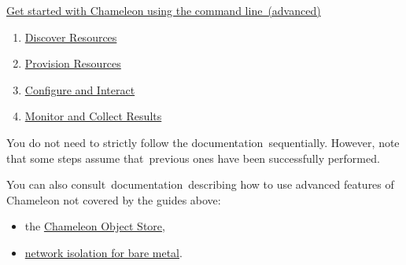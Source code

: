 \href{https://www.chameleoncloud.org/discover-resources-command-lines}{Get
started with Chameleon using the command line~(advanced)}

\begin{enumerate}
\item
  \href{https://www.chameleoncloud.org/discover-resources-command-lines/}{Discover
  Resources}
\item
  \href{https://www.chameleoncloud.org/advanced-provision-resources/}{Provision
  Resources}
\item
  \href{https://www.chameleoncloud.org/advanced-configure-and-interact/}{Configure
  and Interact}
\item
  \href{https://www.chameleoncloud.org/monitor-and-collect/}{Monitor and
  Collect Results}
\end{enumerate}

You do not need to strictly follow the documentation~sequentially.
However, note that some steps assume that~previous ones have been
successfully performed.

You can also consult~documentation~describing how to use advanced
features of Chameleon not covered by the guides above:

\begin{itemize}
\item
  the
  \href{https://www.chameleoncloud.org/docs/bare-metal-user-guide/chameleon-object-store/}{Chameleon
  Object Store},
\item
  \href{https://www.chameleoncloud.org/docs/bare-metal-user-guide/network-isolation-bare-metal/}{network
  isolation for bare metal}.
\end{itemize}


